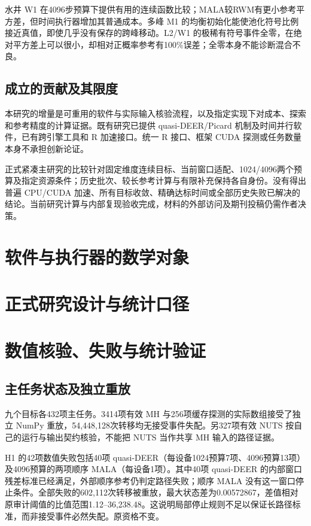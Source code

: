 \documentclass[UTF8,zihao=-4,a4paper,fontset=fandol]{ctexart}
\begin{document}
水井 W1 在4096步预算下提供有用的连续函数比较；MALA较RWM有更小参考平方差，但时间执行器增加其普通成本。多峰 M1 的均衡初始化能使池化符号比例接近真值，即使几乎没有保存的跨峰移动。L2/W1 的极稀有符号事件全零，在绝对平方差上可以很小，却相对正概率参考有100\%误差；全零本身不能诊断混合不良。

\subsection{成立的贡献及其限度}
本研究的增量是可重用的软件与实际输入核验流程，以及指定实现下对成本、探索和参考精度的计算证据。既有研究已提供 quasi-DEER/Picard 机制及时间并行软件\cite{zoltowski,grazzi,gonzalez,parallelmcmc}，已有跨引擎工具和 R 加速接口\cite{comparemcmcs,bayesforge}。统一 R 接口、框架 CUDA 探测或任务数量本身不承担创新论证。

正式紧凑主研究的比较针对固定维度连续目标、当前窗口适配、1024/4096两个预算及指定资源条件；历史批次、较长参考计算与有限补充保持各自身份。没有得出普遍 CPU/CUDA 加速、所有目标收敛、精确达标时间或全部历史失败已解决的结论。当前研究计算与内部复现验收完成，材料的外部访问及期刊投稿仍需作者决策。

\section{软件与执行器的数学对象}



\section{正式研究设计与统计口径}


\section{数值核验、失败与统计验证}
\subsection{主任务状态及独立重放}

九个目标各432项主任务。3414项有效 MH 与256项缓存探测的实际数组接受了独立 NumPy 重放，54,448,128次转移均无接受事件失配。另327项有效 NUTS 按自己的运行与输出契约核验，不能把 NUTS 当作共享 MH 输入的路径证据。

H1 的42项数值失败包括40项 quasi-DEER（每设备1024预算7项、4096预算13项）及4096预算的两项顺序 MALA（每设备1项）。其中40项 quasi-DEER 的内部窗口残差标准已经满足，外部顺序参考仍判定路径失败；顺序 MALA 没有这一窗口停止条件。全部失败的602,112次转移被重放，最大状态差为0.00572867，差值相对原审计阈值的比值范围1.12--36,238.48。这说明局部停止规则不足以保证长路径标准，而非接受事件必然失配。原资格不变。
\end{document}
